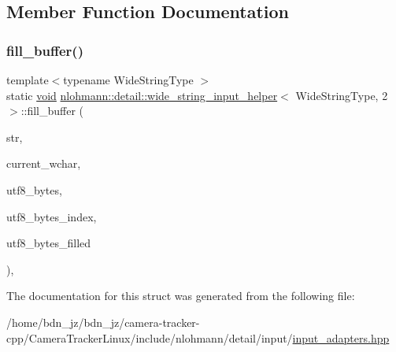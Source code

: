 \subsection{Member Function Documentation}
\mbox{\label{structnlohmann_1_1detail_1_1wide__string__input__helper_3_01_wide_string_type_00_012_01_4_a7ede7749f186f1a6a46c08abb607fd5c}} 
\subsubsection{\texorpdfstring{fill\+\_\+buffer()}{fill\_buffer()}}
{\footnotesize\ttfamily template$<$typename Wide\+String\+Type $>$ \\
static \hyperlink{namespacenlohmann_1_1detail_a59fca69799f6b9e366710cb9043aa77d}{void} \hyperlink{structnlohmann_1_1detail_1_1wide__string__input__helper}{nlohmann\+::detail\+::wide\+\_\+string\+\_\+input\+\_\+helper}$<$ Wide\+String\+Type, 2 $>$\+::fill\+\_\+buffer (\begin{DoxyParamCaption}\item[{const Wide\+String\+Type \&}]{str,  }\item[{size\+\_\+t \&}]{current\+\_\+wchar,  }\item[{\hyperlink{namespacenlohmann_1_1detail_a1ed8fc6239da25abcaf681d30ace4985af1f713c9e000f5d3f280adbd124df4f5}{std\+::array}$<$ std\+::char\+\_\+traits$<$ char $>$\+::int\+\_\+type, 4 $>$ \&}]{utf8\+\_\+bytes,  }\item[{size\+\_\+t \&}]{utf8\+\_\+bytes\+\_\+index,  }\item[{size\+\_\+t \&}]{utf8\+\_\+bytes\+\_\+filled }\end{DoxyParamCaption})\hspace{0.3cm}{\ttfamily [inline]}, {\ttfamily [static]}}



The documentation for this struct was generated from the following file\+:\begin{DoxyCompactItemize}
\item 
/home/bdn\+\_\+jz/bdn\+\_\+jz/camera-\/tracker-\/cpp/\+Camera\+Tracker\+Linux/include/nlohmann/detail/input/\hyperlink{input__adapters_8hpp}{input\+\_\+adapters.\+hpp}\end{DoxyCompactItemize}
